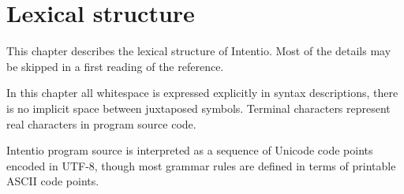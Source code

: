 \chapter{Lexical structure}

This chapter describes the lexical structure of Intentio. Most of the details may be skipped in a first reading of the reference.

In this chapter all whitespace is expressed explicitly in syntax descriptions, there is no implicit space between juxtaposed symbols. Terminal characters represent real characters in program source code.

Intentio program source is interpreted as a sequence of Unicode code points encoded in UTF-8, though most grammar rules are defined in terms of printable ASCII code points.
